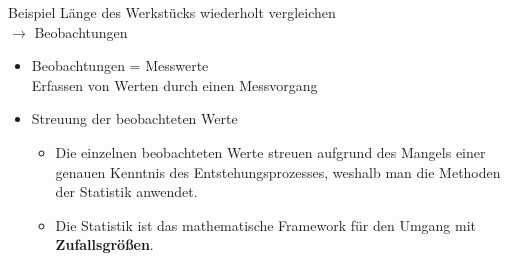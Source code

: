 \begin{raggedright}
\begin{enumerate}
Beispiel Länge des Werkstücks wiederholt vergleichen\\
$\rightarrow$ Beobachtungen
\begin{itemize}
	\item Beobachtungen = Messwerte\\
		Erfassen von Werten durch einen Messvorgang
	\item Streuung der beobachteten Werte
		\begin{itemize}
		\item Die einzelnen beobachteten Werte streuen aufgrund des Mangels einer genauen
		Kenntnis des Entstehungsprozesses, weshalb man die Methoden der Statistik anwendet.
		\item Die Statistik ist das mathematische Framework für den Umgang mit \textbf{Zufallsgrößen}.
	\end{itemize}


\end{itemize}
\end{enumerate}
\end{raggedright}
